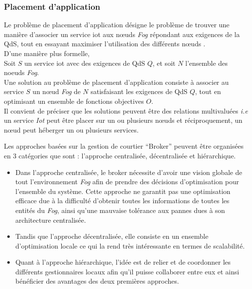 \subsubsection{Placement d'application}
Le problème de placement d’application désigne le problème de trouver une manière d’associer un service iot aux nœuds \emph{Fog} répondant aux exigences de la QdS, tout en essayant maximiser l'utilisation des différents nœuds .\\
D’une manière plus formelle, \\ 
Soit $S$ un service iot avec des exigences de QdS $Q$, et soit $N$ l’ensemble des noeuds \emph{Fog}.\\
Une solution au problème de placement d’application consiste à associer au service $S$ un nœud \emph{Fog} de $N$ satisfaisant les exigences de QdS $Q$, tout en optimisant un ensemble de fonctions objectives $O$.\\
Il convient de préciser que les solutions peuvent être des relations multivaluées \emph{i.e} un service \emph{Iot} peut être placer sur un ou plusieurs nœuds et réciproquement, un nœud peut héberger un ou plusieurs services.\par
Les approches basées sur la gestion de courtier “Broker” peuvent être organisées en 3 catégories que sont : l’approche centralisée, décentralisée et hiérarchique.
\begin{itemize}
  \item Dans l’approche centralisée, le broker nécessite d’avoir une vision globale de tout l'environnement \emph{Fog} afin de prendre des décisions d’optimisation pour l’ensemble du système. Cette approche ne garantit pas une optimisation efficace due à la difficulté d’obtenir toutes les informations de toutes les entités du \emph{Fog}, ainsi qu’une mauvaise tolérance aux pannes dues à son architecture centralisée.
  \item Tandis que  l’approche décentralisée, elle consiste en un ensemble d’optimisation locale ce qui la rend très intéressante en termes de scalabilité.
  \item Quant à l’approche hiérarchique, l'idée est  de relier et de coordonner les différents gestionnaires locaux afin qu’il puisse collaborer entre eux et ainsi bénéficier des avantages des deux premières approches. 
\end{itemize}
